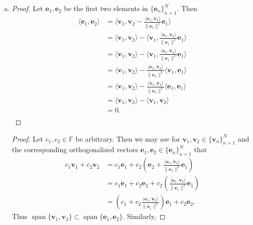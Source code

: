 \documentclass[12pt]{amsart}
\newcommand{\1}{\mathbbm{1}}
\numberwithin{equation}{section}
\numberwithin{Theorem}{section}
\theoremstyle{plain} %
\theoremstyle{definition}
\theoremstyle{remark}
\begin{document}
\begin{enumerate}[1.]
\begin{enumerate}[(a)]
	\item 
	\begin{proof}
		Let \(\mathbf{e}_1,\mathbf{e}_2\) be the first two elements in \(\{\mathbf{e}_{n}\}_{n=1}^{N}\). Then	
	\begin{align*}
		\langle \mathbf{e}_1,\mathbf{e}_2 \rangle
		&= \langle \mathbf{v}_1, \mathbf{v}_2 - \frac{\langle\mathbf{e}_1,\mathbf{v}_2\rangle}{\|\mathbf{e}_1\|^2}\mathbf{e}_1 \rangle  \\
		&= \langle \mathbf{v}_1, \mathbf{v}_2 \rangle - \langle \mathbf{v}_1, \frac{\langle\mathbf{e}_1,\mathbf{v}_2\rangle}{\|\mathbf{e}_1\|^2}\mathbf{e}_1 \rangle  \\
		&= \langle \mathbf{v}_1, \mathbf{v}_2 \rangle - \langle \mathbf{v}_1, \frac{\langle\mathbf{e}_1,\mathbf{v}_2\rangle}{\|\mathbf{e}_1\|^2}\mathbf{e}_1 \rangle  \\
		&= \langle \mathbf{v}_1, \mathbf{v}_2 \rangle - \frac{\langle\mathbf{e}_1,\mathbf{v}_2\rangle}{\|\mathbf{e}_1\|^2} \langle \mathbf{v}_1, \mathbf{e}_1 \rangle  \\
		&= \langle \mathbf{v}_1, \mathbf{v}_2 \rangle - \frac{\langle\mathbf{v}_1,\mathbf{v}_2\rangle}{\|\mathbf{e}_1\|^2} \langle \mathbf{e}_1, \mathbf{e}_1 \rangle  \\
		&= \langle \mathbf{v}_1, \mathbf{v}_2 \rangle - 
		\langle\mathbf{v}_1,\mathbf{v}_2\rangle   \\
		&= 0.  \\
	\end{align*}
	\end{proof}
	\begin{proof}
		Let \(c_1, c_2 \in\mathbb{F}\) be arbitrary. Then we may see for \(\mathbf{v}_1,\mathbf{v}_2 \in \{\mathbf{v}_{n}\}_{n=1}^{N}\) and the corresponding orthogonalized vectors \(\mathbf{e}_1,\mathbf{e}_2 \in\{\mathbf{e}_{n}\}_{n=1}^{N}\) that
		\begin{align*}
			c_1\mathbf{v}_1+c_2\mathbf{v}_2
			&= c_1\mathbf{e}_1+c_2\left( \mathbf{e}_2 + \frac{\langle\mathbf{e}_1,\mathbf{v}_2\rangle}{\|\mathbf{e}_1\|^2}\mathbf{e}_1 \right) \\
			&= c_1\mathbf{e}_1+ c_2\mathbf{e}_2 + c_2\left( \frac{\langle\mathbf{e}_1,\mathbf{v}_2\rangle}{\|\mathbf{e}_1\|^2}\mathbf{e}_1 \right) \\
			&= \left(c_1 + c_2 \frac{\langle\mathbf{e}_1,\mathbf{v}_2\rangle}{\|\mathbf{e}_1\|^2} \right)\mathbf{e}_1 + c_2\mathbf{e}_2.
		\end{align*}
		Thus \(\operatorname{span}\{\mathbf{v}_{1},\mathbf{v}_{2}\} \subset \operatorname{span}\{\mathbf{e}_{1},\mathbf{e}_{2}\}\). Similarly, 

\end{proof}
\end{enumerate}
\end{enumerate}
\end{document}
